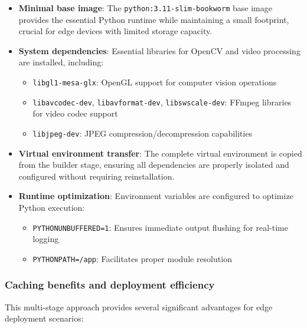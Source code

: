 \begin{itemize}
    \item \textbf{Minimal base image}: The \texttt{python:3.11-slim-bookworm} base image provides the essential Python runtime while maintaining a small footprint, crucial for edge devices with limited storage capacity.
    
    \item \textbf{System dependencies}: Essential libraries for OpenCV and video processing are installed, including:
    \begin{itemize}
        \item \texttt{libgl1-mesa-glx}: OpenGL support for computer vision operations
        \item \texttt{libavcodec-dev}, \texttt{libavformat-dev}, \texttt{libswscale-dev}: FFmpeg libraries for video codec support
        \item \texttt{libjpeg-dev}: JPEG compression/decompression capabilities
    \end{itemize}
    
    \item \textbf{Virtual environment transfer}: The complete virtual environment is copied from the builder stage, ensuring all dependencies are properly isolated and configured without requiring reinstallation.
    
    \item \textbf{Runtime optimization}: Environment variables are configured to optimize Python execution:
    \begin{itemize}
        \item \texttt{PYTHONUNBUFFERED=1}: Ensures immediate output flushing for real-time logging
        \item \texttt{PYTHONPATH=/app}: Facilitates proper module resolution
    \end{itemize}
\end{itemize}

\subsubsection{Caching benefits and deployment efficiency}

This multi-stage approach provides several significant advantages for edge deployment scenarios:

